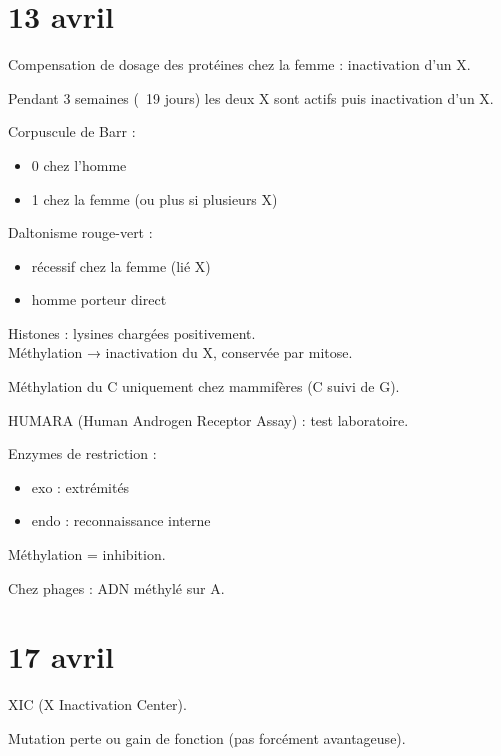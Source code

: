 \documentclass[11pt]{article}
\begin{document}
\section*{13 avril}

Compensation de dosage des protéines chez la femme : inactivation d'un X.

Pendant 3 semaines (~19 jours) les deux X sont actifs puis inactivation d'un X.

Corpuscule de Barr :
\begin{itemize}
    \item 0 chez l'homme
    \item 1 chez la femme (ou plus si plusieurs X)
\end{itemize}

Daltonisme rouge-vert :
\begin{itemize}
    \item récessif chez la femme (lié X)
    \item homme porteur direct
\end{itemize}

\vspace{0.3cm}

Histones : lysines chargées positivement.\\
Méthylation → inactivation du X, conservée par mitose.

Méthylation du C uniquement chez mammifères (C suivi de G).

\vspace{0.3cm}

HUMARA (Human Androgen Receptor Assay) : test laboratoire.

Enzymes de restriction :
\begin{itemize}
    \item exo : extrémités
    \item endo : reconnaissance interne
\end{itemize}

Méthylation = inhibition.

Chez phages : ADN méthylé sur A.

\vspace{0.3cm}

\section*{17 avril}

XIC (X Inactivation Center).

Mutation perte ou gain de fonction (pas forcément avantageuse).
\end{document}
